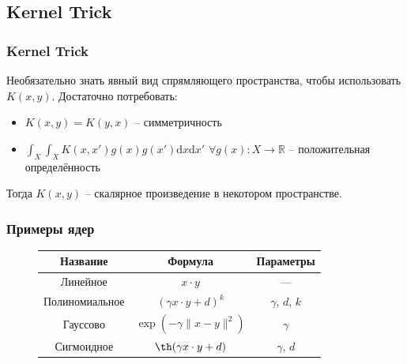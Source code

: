 \documentclass[10pt,pdf]{beamer}
\begin{document}
\subsection{Kernel Trick}
\begin{frame}\frametitle{Kernel Trick}
Необязательно знать явный вид спрямляющего пространства, чтобы использовать $K(x, y)$. Достаточно потребовать:
\begin{itemize}
  \item $K(x, y) = K(y, x)$ -- симметричность
  \item $\int_X\int_X K(x, x')g(x)g(x')\text{d}x\text{d}x'$ $\forall g(x)\colon X \to \mathbb{R}$ -- положительная определённость
\end{itemize}
Тогда $K(x,y)$ --  скалярное произведение в некотором пространстве.
\end{frame}


\begin{frame}\frametitle{Примеры ядер}
\begin{figure}[center]
\begin{tabular}{|c|c|c|}
\hline
Название & Формула & Параметры\\
\hline
Линейное & $x \cdot y$ & ---\\
Полиномиальное & $(\gamma x\cdot y + d)^k$ & $\gamma$, $d$, $k$\\
Гауссово & $\exp(-\gamma\|x - y\|^2)$ & $\gamma$\\
Сигмоидное & $\th(\gamma x\cdot y + d)$ & $\gamma$, $d$\\
\hline
\end{tabular}
\end{figure}
\end{frame}
\end{document}

